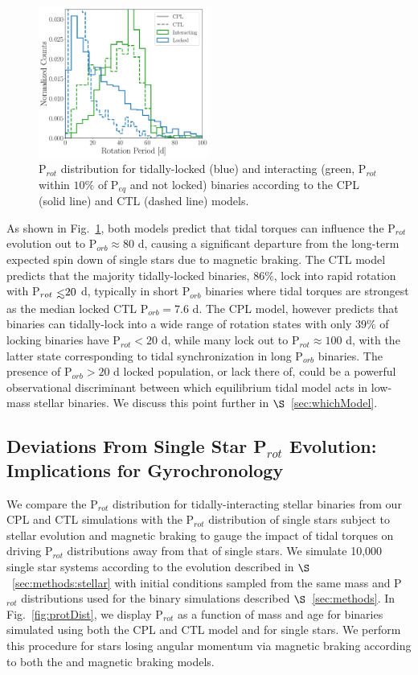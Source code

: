 \documentclass[twocolumn]{aastex61}
\def\lsim{~\rlap{$<$}{\lower 1.0ex\hbox{$\sim$}}}
\begin{document}
\begin{figure}
	\includegraphics[width=0.5\textwidth]{../Plots/lockedProtHist.pdf}
   \caption{P$_{rot}$ distribution for tidally-locked (blue) and interacting (green, P$_{rot}$ within $10\%$ of P$_{eq}$ and not locked) binaries according to the CPL (solid line) and CTL (dashed line) models.}%
    \label{fig:lockedProtHist}%
\end{figure}

As shown in Fig.~\ref{fig:lockedProtHist}, both models predict that tidal torques can influence the P$_{rot}$ evolution out to P$_{orb} \approx 80$ d, causing a significant departure from the long-term expected spin down of single stars due to magnetic braking.  The CTL model predicts that the majority tidally-locked binaries, $86\%$, lock into rapid rotation with P$_{rot} \lsim 20$ d, typically in short P$_{orb}$ binaries where tidal torques are strongest as the median locked CTL P$_{orb} = 7.6$ d. The CPL model, however predicts that binaries can tidally-lock into a wide range of rotation states with only $39\%$ of locking binaries have P$_{rot} < 20$ d, while many lock out to P$_{rot} \approx 100$ d, with the latter state corresponding to tidal synchronization in long P$_{orb}$ binaries.  The presence of P$_{orb} > 20$ d locked population, or lack there of, could be a powerful observational discriminant between which equilibrium tidal model acts in low-mass stellar binaries.  We discuss this point further in $\S$~\ref{sec:whichModel}.

\subsection{Deviations From Single Star P$_{rot}$ Evolution: Implications for Gyrochronology} \label{sec:gyro}

We compare the P$_{rot}$ distribution for tidally-interacting stellar binaries from our CPL and CTL simulations with the P$_{rot}$ distribution of single stars subject to stellar evolution and magnetic braking to gauge the impact of tidal torques on driving P$_{rot}$ distributions away from that of single stars.  We simulate 10,000 single star systems according to the evolution described in $\S$~\ref{sec:methods:stellar} with initial conditions sampled from the same mass and P$_{rot}$ distributions used for the binary simulations described $\S$~\ref{sec:methods}. In Fig.~\ref{fig:protDist}, we display P$_{rot}$ as a function of mass and age for binaries simulated using both the CPL and CTL model and for single stars. We perform this procedure for stars losing angular momentum via magnetic braking according to both the \citet{Matt2015} and \citet{Reiners2012} magnetic braking models.
\end{document}
